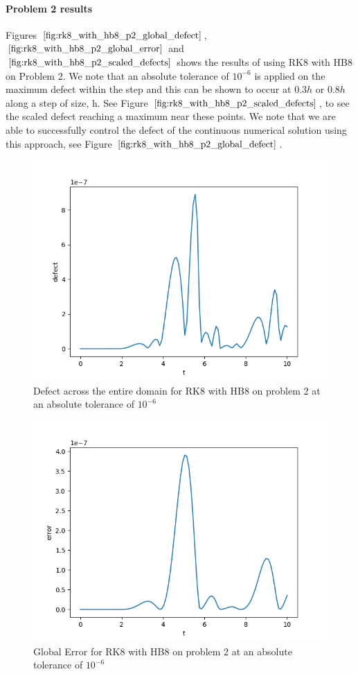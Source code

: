 \paragraph{Problem 2 results}
Figures $\ref{fig:rk8_with_hb8_p2_global_defect}$, $\ref{fig:rk8_with_hb8_p2_global_error}$ and $\ref{fig:rk8_with_hb8_p2_scaled_defects}$ shows the results of using RK8 with HB8 on Problem 2. We note that an absolute tolerance of $10^{-6}$ is applied on the maximum defect within the step and this can be shown to occur at $0.3h$ or $0.8h$ along a step of size, h. See Figure $\ref{fig:rk8_with_hb8_p2_scaled_defects}$, to see the scaled defect reaching a maximum near these points. We note that we are able to successfully control the defect of the continuous numerical solution using this approach, see Figure $\ref{fig:rk8_with_hb8_p2_global_defect}$. 

\begin{figure}[H]
\centering
\includegraphics[width=0.7\linewidth]{./figures/rk8_with_hb8_p2_global_defect}
\caption{Defect across the entire domain for RK8 with HB8 on problem 2 at an absolute tolerance of $10^{-6}$}
\label{fig:rk8_with_hb8_p2_global_defect}
\end{figure}

\begin{figure}[H]
\centering
\includegraphics[width=0.7\linewidth]{./figures/rk8_with_hb8_p2_global_error}
\caption{Global Error for RK8 with HB8 on problem 2 at an absolute tolerance of $10^{-6}$}
\label{fig:rk8_with_hb8_p2_global_error}
\end{figure}

